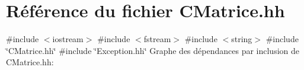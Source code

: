 \hypertarget{CMatrice_8hh}{}\section{Référence du fichier C\+Matrice.\+hh}
\label{CMatrice_8hh}
{\ttfamily \#include $<$iostream$>$}\newline
{\ttfamily \#include $<$fstream$>$}\newline
{\ttfamily \#include $<$string$>$}\newline
{\ttfamily \#include \char`\"{}C\+Matrice.\+hh\char`\"{}}\newline
{\ttfamily \#include \char`\"{}Exception.\+hh\char`\"{}}\newline
Graphe des dépendances par inclusion de C\+Matrice.\+hh\+:

